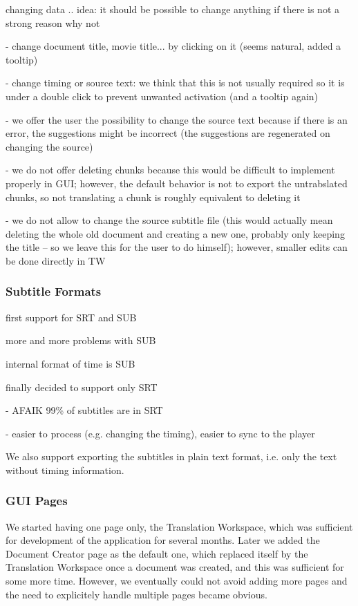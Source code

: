 changing data .. idea: it should be possible to change anything if there is not a strong reason why not

- change document title, movie title... by clicking on it (seems natural, added a tooltip)

- change timing or source text: we think that this is not usually required so it is under a double click to prevent unwanted activation (and a tooltip again)

- we offer the user the possibility to change the source text because if there is an error, the suggestions might be incorrect (the suggestions are regenerated on changing the source)

- we do not offer deleting chunks because this would be difficult to implement properly in GUI; however, the default behavior is not to export the untrabslated chunks, so not translating a chunk is roughly equivalent to deleting it

- we do not allow to change the source subtitle file (this would actually mean deleting the whole old document and creating a new one, probably only keeping the title -- so we leave this for the user to do himself); however, smaller edits can be done directly in TW

\subsubsection{Subtitle Formats}

first support for SRT and SUB

more and more problems with SUB

internal format of time is SUB

finally decided to support only SRT

- AFAIK 99\% of subtitles are in SRT

- easier to process (e.g. changing the timing), easier to sync to the player

We also support exporting the subtitles in plain text format, i.e. only the text without timing information.

\subsubsection{GUI Pages}

We started having one page only, the Translation Workspace, which was sufficient for development of the application for several months. Later we added the Document  Creator page as the default one, which replaced itself by the Translation Workspace once a document was created, and this was sufficient for some more time. However, we eventually could not avoid adding more pages and the need to explicitely handle multiple pages became obvious.

